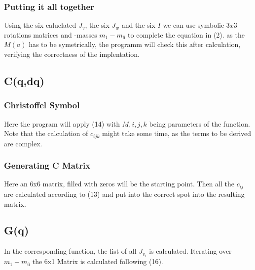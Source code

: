 \documentclass{article}
\begin{document}
\subsubsection{Putting it all together}
Using the six caluclated $J_v$, the six $J_w$ and the six $I$ we can use symbolic $3x3$ rotations matrices and -masses $m_1-m_6$ to complete the equation in (2). as the $M(a)$ has to be symetrically, the programm will check this after calculation, verifying the correctness of the implentation.
\newpage
\subsection{C(q,dq)}
\subsubsection{Christoffel Symbol}
Here the program will apply (14) with $M,i,j,k$ being parameters of the function. Note that the calculation of $c_{ijk}$ might take some time, as the terms to be derived are complex.
\subsubsection{Generating C Matrix}
Here an 6x6 matrix, filled with zeros will be the starting point. Then all the $c_{ij}$ are calculated according to (13) and put into the correct spot into the resulting matrix.
\subsection{G(q)}
In the corresponding function, the list of all $J_{v_i}$ is calculated. Iterating over $m_1-m_6$ the 6x1 Matrix is calculated following (16).
\end{document}
